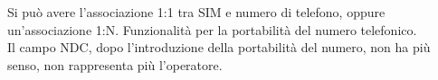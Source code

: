Si può avere l'associazione 1:1 tra SIM e numero di telefono, oppure un'associazione 1:N. Funzionalità per la portabilità del numero telefonico. \\

Il campo NDC, dopo l'introduzione della portabilità del numero, non ha più senso, non rappresenta più l'operatore.\\


\newpage

%
%
%
%
%
%
%
%
%
%
%
%
%
